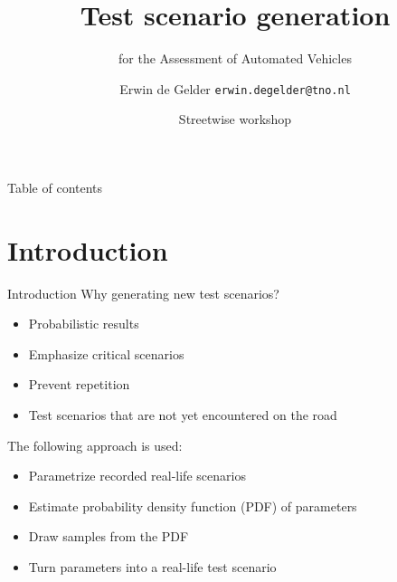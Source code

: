 \documentclass[aspectratio=\AspectR,10pt,compress,t]{beamer} %
\title[Test scenario generation | \insertsubtitle]{Test scenario generation}
\subtitle{for the Assessment of Automated Vehicles}
\author[deGelder]{Erwin de Gelder \texttt{erwin.degelder@tno.nl}}
\date[11th of January]{Streetwise workshop}
\begin{document}
{ %
\blacktitle                     %
\begin{frame}
    \titlepage
\end{frame}}

\begin{frame}{Table of contents}
	\tableofcontents
\end{frame}

\section{Introduction}
\begin{frame}{Introduction}
	Why generating new test scenarios?
	\begin{itemize}
		\item Probabilistic results
		\item Emphasize critical scenarios
		\item Prevent repetition
		\item Test scenarios that are not yet encountered on the road
	\end{itemize}
	\pause
	The following approach is used:
	\begin{itemize}
		\item Parametrize recorded real-life scenarios
		\item Estimate probability density function (PDF) of parameters
		\item Draw samples from the PDF
		\item Turn parameters into a real-life test scenario
	\end{itemize}
\end{frame}
\end{document}
